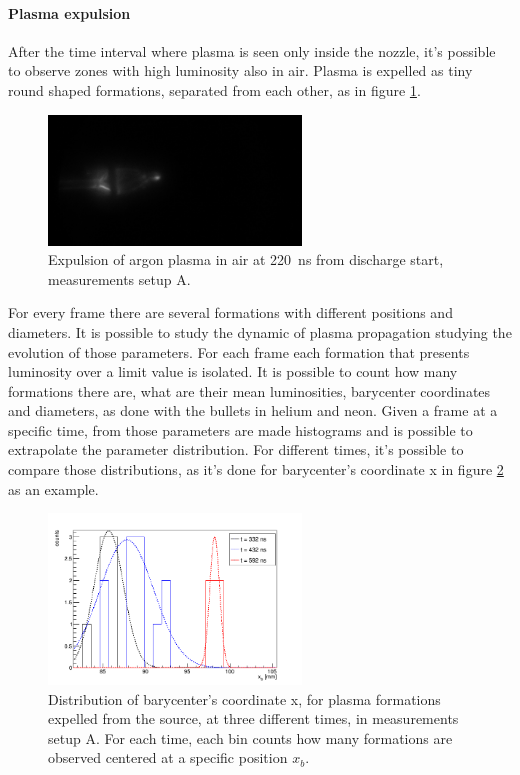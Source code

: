 \paragraph{Plasma expulsion}
After the time interval where plasma is seen only inside the nozzle, it's possible to observe zones with high luminosity also in air. Plasma is expelled as tiny round shaped formations, separated from each other, as in figure \ref{fig:arair_prop}.
\begin{figure}
 \centering
 \includegraphics[width=0.6\textwidth]{Images/Shape/argon_b_220.png}
 \caption{Expulsion of argon plasma in air at \SI{220}{\nano\second} from discharge start, measurements setup A.}
 \label{fig:arair_prop}
\end{figure}

For every frame there are several formations with different positions and diameters. It is possible to study the dynamic of plasma propagation studying the evolution of those parameters.
For each frame each formation that presents luminosity over a limit value is isolated. It is possible to count how many formations there are, what are their mean luminosities, barycenter coordinates and diameters, as done with the bullets in helium and neon.
Given a frame at a specific time, from those parameters are made histograms and is possible to extrapolate the parameter distribution. For different times, it's possible to compare those distributions, as it's done for barycenter's coordinate x in figure \ref{fig:argon_xb_evol} as an example. 
\begin{figure}
 \centering
 \includegraphics[width=0.6\textwidth]{Images/Shape/argon_b_xbevol.png}
 \caption{Distribution of barycenter's coordinate x, for plasma formations expelled from the source, at three different times, in measurements setup A. For each time, each bin counts how many formations are observed centered at a specific position $x_b$.}
 \label{fig:argon_xb_evol}
\end{figure}


